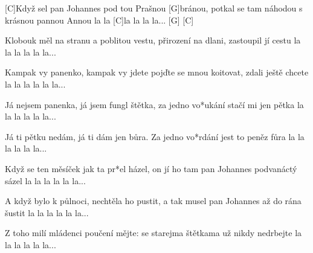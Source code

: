 
[C]Když sel pan Johannes pod tou Prašnou [G]bránou,
potkal se tam náhodou s krásnou pannou Annou
la la [C]la la la la... [G] [C]

Klobouk měl na stranu a poblitou vestu,
přirození na dlani, zastoupil jí cestu
la la la la la la...

Kampak vy panenko, kampak vy jdete
pojďte se mnou koitovat, zdali ještě chcete
la la la la la la...

Já nejsem panenka, já jsem fungl štětka,
za jedno vo*ukání stačí mi jen pětka
la la la la la la...

Já ti pětku nedám, já ti dám jen bůra.
Za jedno vo*rdání jest to peněz fůra
la la la la la la...

Když se ten měsíček jak ta pr*el házel,
on jí ho tam pan Johannes podvanáctý sázel
la la la la la la...

A když bylo k půlnoci, nechtěla ho pustit,
a tak musel pan Johannes až do rána šustit
la la la la la la...

Z toho milí mládenci poučení mějte:
se starejma štětkama už nikdy nedrbejte
la la la la la la...